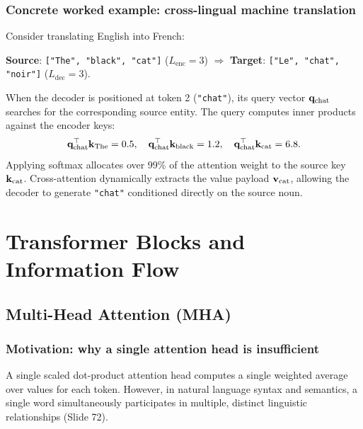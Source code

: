 \documentclass[../../main.tex]{subfiles}
\begin{document}
\subsubsection{Concrete worked example: cross-lingual machine translation}
Consider translating English into French:
\begin{center}
\textbf{Source}: \texttt{["The", "black", "cat"]} ($L_{\text{enc}} = 3$) \quad $\Longrightarrow$ \quad \textbf{Target}: \texttt{["Le", "chat", "noir"]} ($L_{\text{dec}} = 3$).
\end{center}
When the decoder is positioned at token 2 (\texttt{"chat"}), its query vector $\mathbf{q}_{\text{chat}}$ searches for the corresponding source entity. The query computes inner products against the encoder keys:
\begin{equation}
\mathbf{q}_{\text{chat}}^\top \mathbf{k}_{\text{The}} = 0.5, \quad \mathbf{q}_{\text{chat}}^\top \mathbf{k}_{\text{black}} = 1.2, \quad \mathbf{q}_{\text{chat}}^\top \mathbf{k}_{\text{cat}} = 6.8.
\end{equation}
Applying softmax allocates over 99\% of the attention weight to the source key $\mathbf{k}_{\text{cat}}$. Cross-attention dynamically extracts the value payload $\mathbf{v}_{\text{cat}}$, allowing the decoder to generate \texttt{"chat"} conditioned directly on the source noun.

\clearpage
\section{Transformer Blocks and Information Flow}
\label{sec:transformer_core_blocks_journey}

\subsection{Multi-Head Attention (MHA)}
\label{subsec:multi_head_attention_deep}

\subsubsection{Motivation: why a single attention head is insufficient}
A single scaled dot-product attention head computes a single weighted average over values for each token. However, in natural language syntax and semantics, a single word simultaneously participates in multiple, distinct linguistic relationships (Slide 72).
\end{document}
